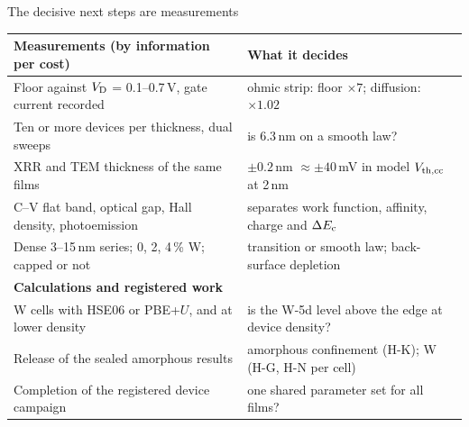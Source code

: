 \begin{frame}{The decisive next steps are measurements}
  \fourteenTop
  \begingroup\footnotesize
  \setlength{\tabcolsep}{3pt}
  \renewcommand{\arraystretch}{1.2}
  \begin{tabular}{@{}>{\raggedright\arraybackslash}p{6.9cm}>{\raggedright\arraybackslash}p{6.88cm}@{}}
    \toprule
    \textbf{Measurements (by information per cost)} & \textbf{What it decides} \\
    \midrule
    Floor against $V_{\mathrm{D}}$ = 0.1--0.7\,V, gate current recorded & ohmic strip: floor $\times7$; diffusion: $\times1.02$ \\
    Ten or more devices per thickness, dual sweeps & is 6.3\,nm on a smooth law? \\
    XRR and TEM thickness of the same films & $\pm0.2$\,nm $\approx\pm40$\,mV in model $V_{\mathrm{th,cc}}$ at 2\,nm \\
    C--V flat band, optical gap, Hall density, photoemission & separates work function, affinity, charge and $\Delta E_{\mathrm{c}}$ \\
    Dense 3--15\,nm series; 0, 2, 4\,\% W; capped or not & transition or smooth law; back-surface depletion \\
    \midrule
    \textbf{Calculations and registered work} & \\
    \midrule
    W cells with HSE06 or PBE+$U$, and at lower density & is the W-5d level above the edge at device density? \\
    Release of the sealed amorphous results & amorphous confinement (H-K); W (H-G, H-N per cell) \\
    Completion of the registered device campaign & one shared parameter set for all films? \\
    \bottomrule
  \end{tabular}\par\endgroup
\end{frame}
